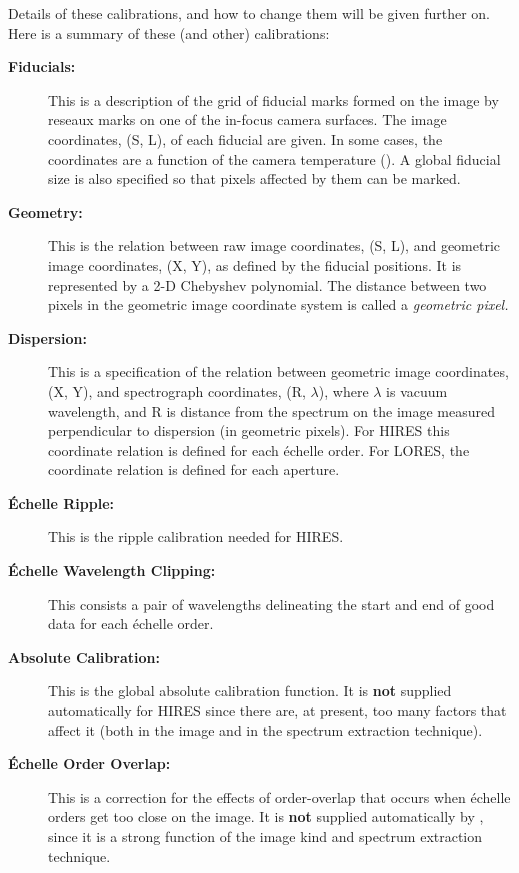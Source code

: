 Details of these calibrations, and how to change them will be given
further on. Here is a summary of these (and other) calibrations:

\begin{description}

\item [{\bf Fiducials:}]
      This is a description of the grid of fiducial marks formed
      on the image by reseaux marks on one of the in-focus camera surfaces.
      The image coordinates, (S, L), of each fiducial are given.  In some
      cases, the coordinates are a function of the camera temperature
      ()\@.
      A global fiducial size is also specified so that pixels affected by
      them can be marked.

\item [{\bf Geometry:}]
      This is the relation between raw image coordinates, (S, L),
      and geometric image coordinates, (X, Y), as defined by the fiducial
      positions.  It is represented by a 2-D Chebyshev polynomial.  The
      distance between two pixels in the geometric image coordinate system is
      called a {\em geometric pixel.}

\item [{\bf Dispersion:}]
      This is a specification of the relation between geometric
      image coordinates, (X, Y), and spectrograph coordinates, (R, $\lambda$),
      where $\lambda$ is vacuum wavelength, and R is distance from the spectrum
      on the image measured perpendicular to dispersion (in geometric
      pixels)\@.  For HIRES this coordinate relation is defined for each
      \'{e}chelle order.  For LORES, the coordinate relation is defined for
      each aperture.

\item [{\bf \'{E}chelle Ripple:}]
      This is the ripple calibration needed for HIRES.

\item [{\bf \'{E}chelle Wavelength Clipping:}]
      This consists a pair of wavelengths
      delineating the start and end of good data for each \'{e}chelle
      order.

\item [{\bf Absolute Calibration:}]
      This is the global absolute calibration function.
      It is {\bf not} supplied automatically for HIRES since there are, at
      present, too many factors that affect it (both in the image and in the
      spectrum extraction technique)\@.

\item [{\bf \'{E}chelle Order Overlap:}]
      This is a correction for the effects of
      order-overlap that occurs when \'{e}chelle orders get too close on the
      image.  It is {\bf not} supplied automatically by
      , since
      it is a strong function of the image kind and spectrum extraction
      technique.


\end{description}
